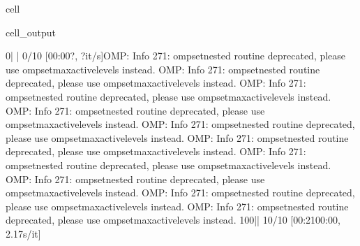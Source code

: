 \documentclass[letterpaper,table,10pt,english]{jupyterBook}
\begin{document}
\begin{sphinxuseclass}{cell}
\begin{sphinxVerbatimOutput}
\begin{sphinxuseclass}{cell_output}
\begin{sphinxVerbatim}[commandchars=\\\{\}]
  0\PYGZpc{}|                                                                                                              | 0/10 [00:00\PYGZlt{}?, ?it/s]OMP: Info \PYGZsh{}271: omp\PYGZus{}set\PYGZus{}nested routine deprecated, please use omp\PYGZus{}set\PYGZus{}max\PYGZus{}active\PYGZus{}levels instead.
OMP: Info \PYGZsh{}271: omp\PYGZus{}set\PYGZus{}nested routine deprecated, please use omp\PYGZus{}set\PYGZus{}max\PYGZus{}active\PYGZus{}levels instead.
OMP: Info \PYGZsh{}271: omp\PYGZus{}set\PYGZus{}nested routine deprecated, please use omp\PYGZus{}set\PYGZus{}max\PYGZus{}active\PYGZus{}levels instead.
OMP: Info \PYGZsh{}271: omp\PYGZus{}set\PYGZus{}nested routine deprecated, please use omp\PYGZus{}set\PYGZus{}max\PYGZus{}active\PYGZus{}levels instead.
OMP: Info \PYGZsh{}271: omp\PYGZus{}set\PYGZus{}nested routine deprecated, please use omp\PYGZus{}set\PYGZus{}max\PYGZus{}active\PYGZus{}levels instead.
OMP: Info \PYGZsh{}271: omp\PYGZus{}set\PYGZus{}nested routine deprecated, please use omp\PYGZus{}set\PYGZus{}max\PYGZus{}active\PYGZus{}levels instead.
OMP: Info \PYGZsh{}271: omp\PYGZus{}set\PYGZus{}nested routine deprecated, please use omp\PYGZus{}set\PYGZus{}max\PYGZus{}active\PYGZus{}levels instead.
OMP: Info \PYGZsh{}271: omp\PYGZus{}set\PYGZus{}nested routine deprecated, please use omp\PYGZus{}set\PYGZus{}max\PYGZus{}active\PYGZus{}levels instead.
OMP: Info \PYGZsh{}271: omp\PYGZus{}set\PYGZus{}nested routine deprecated, please use omp\PYGZus{}set\PYGZus{}max\PYGZus{}active\PYGZus{}levels instead.
OMP: Info \PYGZsh{}271: omp\PYGZus{}set\PYGZus{}nested routine deprecated, please use omp\PYGZus{}set\PYGZus{}max\PYGZus{}active\PYGZus{}levels instead.
100\PYGZpc{}|\PYGZsh{}\PYGZsh{}\PYGZsh{}\PYGZsh{}\PYGZsh{}\PYGZsh{}\PYGZsh{}\PYGZsh{}\PYGZsh{}\PYGZsh{}\PYGZsh{}\PYGZsh{}\PYGZsh{}\PYGZsh{}\PYGZsh{}\PYGZsh{}\PYGZsh{}\PYGZsh{}\PYGZsh{}\PYGZsh{}\PYGZsh{}\PYGZsh{}\PYGZsh{}\PYGZsh{}\PYGZsh{}\PYGZsh{}\PYGZsh{}\PYGZsh{}\PYGZsh{}\PYGZsh{}\PYGZsh{}\PYGZsh{}\PYGZsh{}\PYGZsh{}\PYGZsh{}\PYGZsh{}\PYGZsh{}\PYGZsh{}\PYGZsh{}\PYGZsh{}\PYGZsh{}\PYGZsh{}\PYGZsh{}\PYGZsh{}\PYGZsh{}\PYGZsh{}\PYGZsh{}\PYGZsh{}\PYGZsh{}\PYGZsh{}\PYGZsh{}\PYGZsh{}\PYGZsh{}\PYGZsh{}\PYGZsh{}\PYGZsh{}\PYGZsh{}\PYGZsh{}\PYGZsh{}\PYGZsh{}\PYGZsh{}\PYGZsh{}\PYGZsh{}\PYGZsh{}\PYGZsh{}\PYGZsh{}\PYGZsh{}\PYGZsh{}\PYGZsh{}\PYGZsh{}\PYGZsh{}\PYGZsh{}\PYGZsh{}\PYGZsh{}\PYGZsh{}\PYGZsh{}\PYGZsh{}\PYGZsh{}\PYGZsh{}\PYGZsh{}\PYGZsh{}\PYGZsh{}\PYGZsh{}\PYGZsh{}\PYGZsh{}\PYGZsh{}\PYGZsh{}\PYGZsh{}\PYGZsh{}\PYGZsh{}\PYGZsh{}\PYGZsh{}\PYGZsh{}\PYGZsh{}\PYGZsh{}\PYGZsh{}\PYGZsh{}\PYGZsh{}\PYGZsh{}\PYGZsh{}\PYGZsh{}| 10/10 [00:21\PYGZlt{}00:00,  2.17s/it]
\end{sphinxVerbatim}

\end{sphinxuseclass}\end{sphinxVerbatimOutput}

\end{sphinxuseclass}
\sphinxAtStartPar
{}
\end{document}
